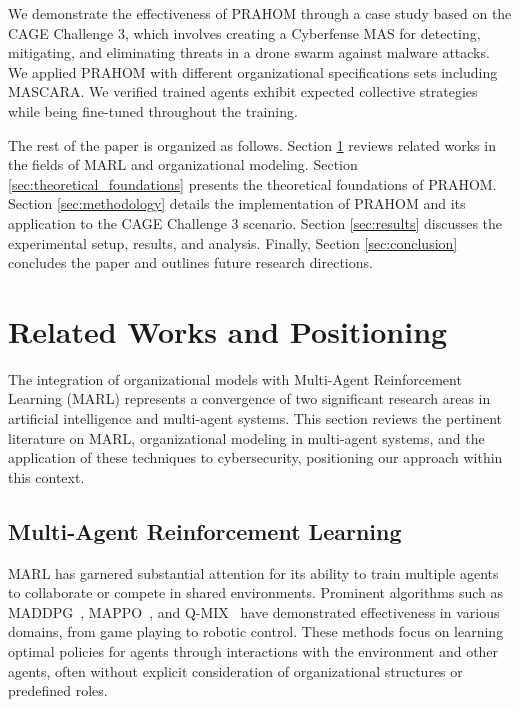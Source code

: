 \documentclass[conference]{IEEEtran}
\begin{document}
We demonstrate the effectiveness of PRAHOM through a case study based on the CAGE Challenge 3, which involves creating a Cyberfense MAS for detecting, mitigating, and eliminating threats in a drone swarm against malware attacks. We applied PRAHOM with different organizational specifications sets including MASCARA. We verified trained agents exhibit expected collective strategies while being fine-tuned throughout the training.

The rest of the paper is organized as follows. Section \ref{sec:related_works} reviews related works in the fields of MARL and organizational modeling. Section \ref{sec:theoretical_foundations} presents the theoretical foundations of PRAHOM. Section \ref{sec:methodology} details the implementation of PRAHOM and its application to the CAGE Challenge 3 scenario. Section \ref{sec:results} discusses the experimental setup, results, and analysis. Finally, Section \ref{sec:conclusion} concludes the paper and outlines future research directions.

\section{Related Works and Positioning}
\label{sec:related_works}

The integration of organizational models with Multi-Agent Reinforcement Learning (MARL) represents a convergence of two significant research areas in artificial intelligence and multi-agent systems. This section reviews the pertinent literature on MARL, organizational modeling in multi-agent systems, and the application of these techniques to cybersecurity, positioning our approach within this context.

\subsection{Multi-Agent Reinforcement Learning}
MARL has garnered substantial attention for its ability to train multiple agents to collaborate or compete in shared environments. Prominent algorithms such as MADDPG~\cite{lowe2017multi}, MAPPO~\cite{yu2022surprising}, and Q-MIX~\cite{rashid2018qmix} have demonstrated effectiveness in various domains, from game playing to robotic control. These methods focus on learning optimal policies for agents through interactions with the environment and other agents, often without explicit consideration of organizational structures or predefined roles.
\end{document}
